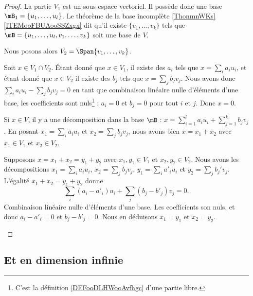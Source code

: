 \begin{proof}
	La partie \( V_1\) est un sous-espace vectoriel. Il possède donc une base \(\mB_1= \{ u_1,\ldots,u_l \}\). Le théorème de la base incomplète \ref{ThonmnWKs}\ref{ITEMooFBUAooSSZxgx} dit qu'il existe \( \{ v_1,\ldots,v_k \}\) tels que \( \mB=\{ u_1,\ldots,u_l,v_1,\ldots,v_k \}\) soit une base de \( V\).

	Nous posons alors \( V_2=\Span\{ v_1,\ldots,v_k \}\).
	\begin{subproof}
		\spitem[\( V_1\cap V_2=\{ 0 \}\)]
		Soit \( x\in V_1\cap V_2\). Étant donné que \( x\in V_1\), il existe des \( a_i\) tels que \( x=\sum_ia_iu_i\), et étant donné que \( x\in V_2\) il existe des \( b_j \) tels que \( x=\sum_jb_jv_j\). Nous avons donc \( \sum_ia_iu_i-\sum_jb_jv_j=0\) en tant que combinaison linéaire nulle d'éléments d'une base, les coefficients sont nuls\footnote{C'est la définition \ref{DEFooDLHWooAvfhgc} d'une partie libre.} : \( a_i=0\) et \( b_j=0\) pour tout \( i\) et \( j\). Donc \( x=0\).

		Si \( x\in V\), il y a une décomposition dans la base \( \mB\) : \( x=\sum_{i=1}^la_iu_i+  \sum_{j=1}^kb_jv_j\). En posant \( x_1=\sum_ia_iu_i\) et \( x_2=\sum_jb_jv_j\), nous avons bien \( x=x_1+x_2\) avec \( x_1\in V_1\) et \( x_2\in V_2\).

		Supposons \( x=x_1+x_2=y_1+y_2\) avec \( x_1,y_1\in V_1\) et \( x_2,y_2\in V_2\). Nous avons les décompositions \( x_1=\sum_ia_iu_i\), \( x_2=\sum_jb_jv_j\), \( y_1=\sum_ia'_iu_i\) et \( y_2=\sum_jb_j'v_j\). L'égalité \( x_1+x_2=y_1+y_2\) donne
		\begin{equation}
			\sum_i(a_i-a'_i)u_i+\sum_j(b_j-b'_j)v_j=0.
		\end{equation}
		Combinaison linéaire nulle d'éléments d'une base. Les coefficients son nuls, et donc \( a_i-a'_i=0\) et \( b_j-b'_j=0\). Nous en déduisons \( x_1=y_1\) et \( x_2=y_2\).
	\end{subproof}
\end{proof}

\subsection{Et en dimension infinie}

